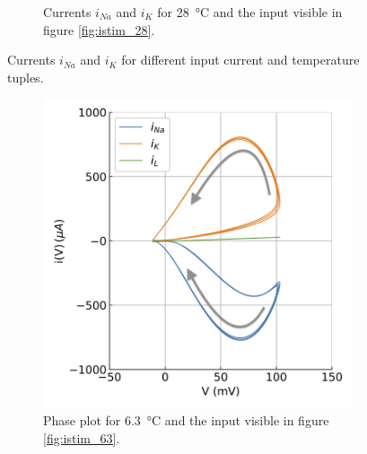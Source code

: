 \documentclass{scrartcl}			%
\begin{document}
\begin{figure}[H]
\begin{subfigure}[b]{0.5\linewidth}
    \caption{Currents $i_{Na}$ and $i_{K}$ for \SI{28}{\celsius} and the input visible in figure \ref{fig:istim_28}.} 
    \label{fig:curr_28} 
    \end{subfigure} 
  \caption{Currents $i_{Na}$ and $i_{K}$ for different input current and temperature tuples.}
  \label{fig:curr} 
\end{figure}

\begin{figure}[H] 
  \begin{subfigure}[b]{0.5\linewidth}
    \centering
    \includegraphics[width=\linewidth]{imgs/current_phases_at_6.jpeg} 
    \caption{Phase plot for \SI{6.3}{\celsius} and the input visible in figure \ref{fig:istim_63}.} 
    \label{fig:phases_63} 
  \end{subfigure}%
  \quad
  \begin{subfigure}[b]{0.5\linewidth}
    \centering

\end{subfigure}
\end{figure}
\end{document}
